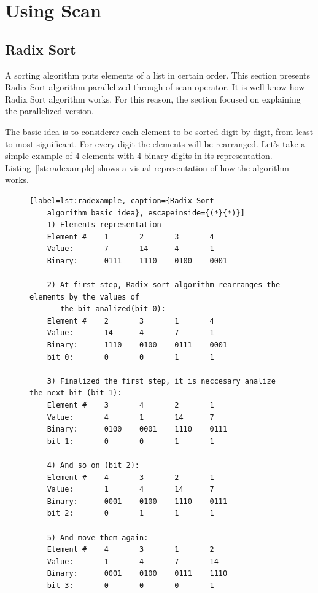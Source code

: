 \documentclass[Ingles]{ic-tese-v1}
\newcommand{\rlst}[1]{Listing~\ref{lst:#1}}
\begin{document}
\chapter{Using Scan}
\label{cap:ScanUse}

\section{Radix Sort}
\label{sec:Quicksort}

A sorting algorithm puts elements of a list in certain order. This section
presents Radix Sort algorithm parallelized through of scan operator. It is
well know how Radix Sort algorithm works.  For this reason, the section
focused on explaining the parallelized version.

The basic idea is to considerer each element to be sorted digit by digit, from
least to most significant. For every digit the elements will be rearranged.
Let’s take a simple example of 4 elements with 4 binary digits in its
representation. \rlst{radexample} shows a visual representation of how the
algorithm works.

\begin{figure}[t]
	\lstset{basicstyle=\scriptsize}
	\begin{lstlisting}[label=lst:radexample, caption={Radix Sort
	algorithm basic idea}, escapeinside={(*}{*)}]
	1) Elements representation
	Element #    1       2       3       4
	Value:       7       14      4       1
	Binary:      0111    1110    0100    0001

	2) At first step, Radix sort algorithm rearranges the elements by the values of
	   the bit analized(bit 0):
	Element #    2       3       1       4
	Value:       14      4       7       1
	Binary:      1110    0100    0111    0001
	bit 0:       0       0       1       1

	3) Finalized the first step, it is neccesary analize the next bit (bit 1):
	Element #    3       4       2       1
	Value:       4       1       14      7
	Binary:      0100    0001    1110    0111
	bit 1:       0       0       1       1

	4) And so on (bit 2):
	Element #    4       3       2       1
	Value:       1       4       14      7
	Binary:      0001    0100    1110    0111
	bit 2:       0       1       1       1

	5) And move them again:
	Element #    4       3       1       2
	Value:       1       4       7       14
	Binary:      0001    0100    0111    1110
	bit 3:       0       0       0       1

	\end{lstlisting}
\end{figure}
\end{document}
